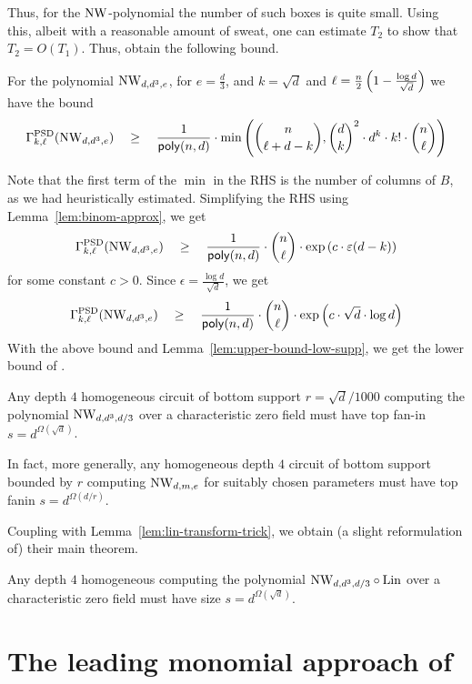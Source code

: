 Thus, for the $\mathrm{NW}$-polynomial the number of such boxes is quite small. Using this, albeit with a reasonable amount of sweat, one can estimate $T_2$ to show that $T_2 = O(T_1)$. Thus, \cite{KLSS} obtain the following bound. 

\begin{lemma}
For the polynomial $\mathrm{NW}_{d,d^3,e}$, for $e = \frac{d}{3}$, and $k = \sqrt{d}$ and $\ell = \frac{n}{2}\left(1 - \frac{\log d}{\sqrt{d}}\right)$ we have the bound
\[
\Gamma^{\mathrm{PSD}}_{k,\ell}(\mathrm{NW}_{d,d^3,e}) \quad \geq \quad \frac{1}{\mathsf{poly}(n,d)} \cdot \min\left(\binom{n}{\ell + d - k}, \binom{d}{k}^2 \cdot d^k \cdot k! \cdot \binom{n}{\ell}\right)
\]
\end{lemma}
Note that the first term of the $\min$ in the RHS is the number of columns of $B$, as we had heuristically estimated. Simplifying the RHS using Lemma~\ref{lem:binom-approx}, we get
\[
\Gamma^{\mathrm{PSD}}_{k,\ell}(\mathrm{NW}_{d,d^3,e}) \quad \geq \quad \frac{1}{\mathsf{poly}(n,d)} \cdot \binom{n}{\ell}\cdot \exp\left(c\cdot \varepsilon (d - k)\right)
\]
for some constant $c > 0$. Since $\epsilon = \frac{\log d}{\sqrt{d}}$, we get 
\[
\Gamma^{\mathrm{PSD}}_{k,\ell}(\mathrm{NW}_{d,d^3,e}) \quad \geq \quad \frac{1}{\mathsf{poly}(n,d)} \cdot \binom{n}{\ell}\cdot \exp\left(c\cdot \sqrt{d}\cdot \log d\right)
\]
With the above bound and Lemma~\ref{lem:upper-bound-low-supp}, we get the lower bound of \cite{KLSS}. 
\begin{theorem}\label{thm:KLSS-lowsupp}
Any depth $4$ homogeneous circuit of bottom support $r = \sqrt{d}/1000$ computing the polynomial $\mathrm{NW}_{d,d^3,d/3}$ over a characteristic zero field must have top fan-in $s = d^{\Omega(\sqrt{d})}$. 

In fact, more generally, any homogeneous depth $4$ circuit of bottom support bounded by $r$ computing $\mathrm{NW}_{d,m,e}$ for suitably chosen parameters must have top fanin $s = d^{\Omega(d/r)}$. 
\end{theorem}

Coupling with Lemma~\ref{lem:lin-transform-trick}, we obtain (a slight reformulation of) their main theorem. 

\begin{theorem}\label{thm:KLSS-main}
Any depth $4$ homogeneous computing the polynomial $\mathrm{NW}_{d,d^3,d/3}\circ \mathrm{Lin}$ over a characteristic zero field must have size $s = d^{\Omega(\sqrt{d})}$. 
\end{theorem}

\section{The leading monomial approach of \cite{KS14}}

